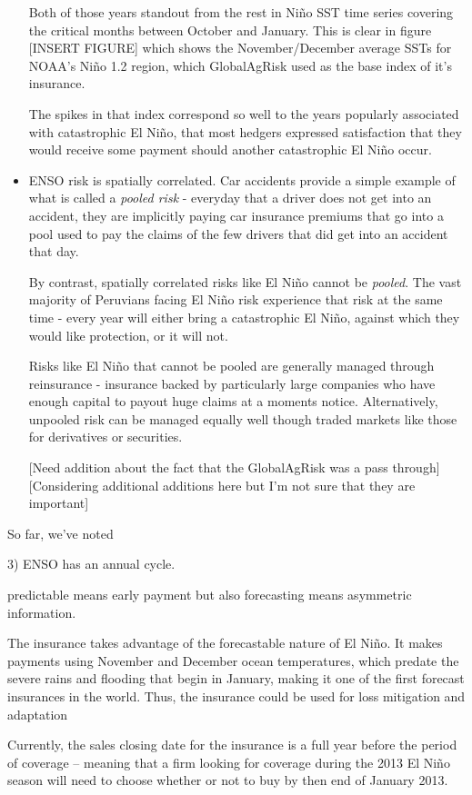 \documentclass[authoryear]{article}
\begin{document}
\begin{itemize}
Both of those years standout from the rest in Ni\~no SST time series covering the critical months between October and January. This is clear in figure [INSERT FIGURE] which shows the November/December average SSTs for NOAA's Ni\~no 1.2 region, which GlobalAgRisk used as the base index of it's insurance.

The spikes in that index correspond so well to the years popularly associated with catastrophic El Ni\~no, that most hedgers expressed satisfaction that they would receive some payment should another catastrophic El Ni\~no occur.

\item ENSO risk is spatially correlated.
Car accidents provide a simple example of what is called a \emph{pooled risk} - everyday that a driver does not get into an accident, they are implicitly paying car insurance premiums that go into a pool used to pay the claims of the few drivers that did get into an accident that day. 

By contrast, spatially correlated risks like El Ni\~no cannot be \emph{pooled}. The vast majority of Peruvians facing El Ni\~no risk experience that risk at the same time - every year will either bring a catastrophic El Ni\~no, against which they would like protection, or it will not. 

Risks like El Ni\~no that cannot be pooled are generally managed through reinsurance -  insurance backed by particularly large companies who have enough capital to payout huge claims at a moments notice. Alternatively, unpooled risk can be managed equally well though traded markets like those for derivatives or securities. 

[Need addition about the fact that the GlobalAgRisk was a pass through]
[Considering additional additions here but I'm not sure that they are important]
\end{itemize}
So far, we've noted 

3) ENSO has an annual cycle.

predictable means early payment but also forecasting means asymmetric information. 

The insurance takes advantage of the forecastable nature of El Ni\~no. It makes payments using November and December ocean temperatures, which predate the severe rains and flooding that begin in January, making it one of the first forecast insurances in the world. Thus, the insurance could be used for loss mitigation and adaptation

Currently, the sales closing date for the insurance is a full year before the period of coverage – meaning that a firm looking for coverage during the 2013 El Ni\~no season will need to choose whether or not to buy by then end of January 2013. 
\end{document}
